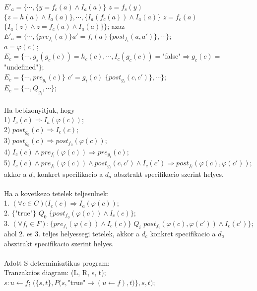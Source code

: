 \documentclass[a4paper,10pt]{article}
\begin{document}
$E'_a=\lbrace\cdots, \lbrace y=f_c(a)\wedge I_a(a)\rbrace$ $z=f_s(y)$ $\lbrace z=h(a)\wedge I_a(a)\rbrace,\cdots, \lbrace I_a(f_c(a))\wedge I_a(a)\rbrace$ $z=f_c(a)$ $\lbrace I_a(z)\wedge z=f_c(a) \wedge I_a(a)\rbrace\rbrace$; azaz
$E'_a=\lbrace\cdots, \lbrace pre_{f_i}(a)\rbrace a'=f_i(a) \lbrace post_{f_i}(a,a')\rbrace, \cdots\rbrace$;\\
$a=\varphi(c)$;\\
$E_c = \lbrace\cdots, g_s(g_c(c))=h_c(c),\cdots,I_c(g_c(c)) = $"false"$ \Rightarrow g_c(c)=$ "undefined"$\rbrace$;\\
$E_c = \lbrace\cdots, pre_{g_i}(c)\rbrace$ $c'=g_i(c)$ $\lbrace post_{g_i}(c,c')\rbrace,\cdots\rbrace$;\\
$E_c = \lbrace\cdots, Q_{g_i}, \cdots\rbrace$;\\\\
Ha bebizonyitjuk, hogy\\
1) $I_c(c) \Rightarrow I_a(\varphi(c))$;\\
2) $post_{g_0}(c) \Rightarrow I_c(c)$;\\
3) $post_{g_0}(c) \Rightarrow post_{f_0}(\varphi(c))$;\\
4) $I_c(c) \wedge pre_{f_i}(\varphi(c)) \Rightarrow pre_{g_i}(c)$;\\
5) $I_c(c) \wedge pre_{f_i}(\varphi(c)) \wedge post_{g_i}(c,c') \wedge I_c(c') \Rightarrow post_{f_i}(\varphi(c), \varphi(c'))$;\\
akkor a $d_c$ konkret specifikacio a $d_a$ absztrakt specifikacio szerint helyes.\\\\
Ha a kovetkezo tetelek teljesulnek:\\
1. $(\forall c \in C) (I_c(c) \Rightarrow I_a(\varphi(c))$;\\
2. $\lbrace$"true"$\rbrace$ $Q_0$ $\lbrace post_{f_0}(\varphi(c)) \wedge I_c(c)\rbrace$;\\
3. $(\forall f_i\in F): \lbrace pre_{f_i}(\varphi(c)) \wedge I_c(c)\rbrace$ $Q_i$ $post_{f_i}(\varphi(c), \varphi(c')) \wedge I_c(c')\rbrace$;\\
ahol 2. es 3. teljes helyessegi tetelek, akkor a $d_c$ konkret specifikacio a $d_a$ absztrakt specifikacio szerint helyes.\\\\
Adott S determinisztikus program:\\
Tranzakcios diagram: (L, R, s, t);\\
$s: u\gets f$; $(\lbrace s,t\rbrace,P(s,$"true"$\to (u \gets f), t)\rbrace, s, t)$;\\ \\
\end{document}
